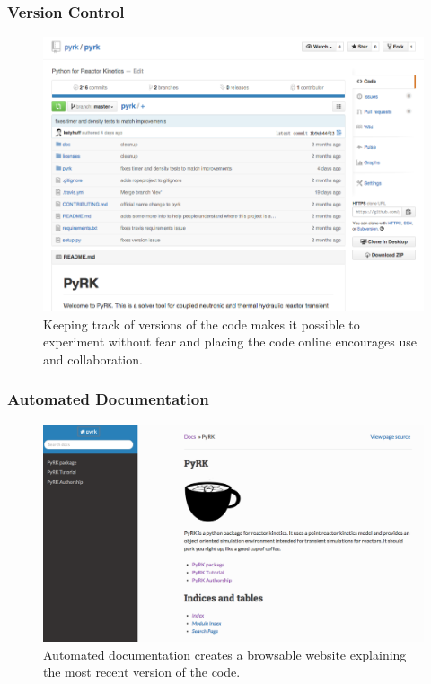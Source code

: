 \begin{frame}[fragile]
  \frametitle{Version Control}
  \begin{figure}[htbp!]
    \begin{center}
      \includegraphics[height=0.7\textheight]{./progress/github_pyrk.png}
    \end{center}
    \caption{Keeping track of versions of the code makes it possible to
    experiment without fear and placing the code online encourages use and
    collaboration.}
    \label{fig:doc_pyrk}
  \end{figure}
\end{frame}

\begin{frame}[fragile]
  \frametitle{Automated Documentation}
  \begin{figure}[htbp!]
    \begin{center}
      \includegraphics[height=0.7\textheight]{./progress/doc_pyrk.png}
    \end{center}
    \caption{Automated documentation creates a browsable website explaining the most recent version of the code.}
    \label{fig:doc_pyrk}
  \end{figure}
\end{frame}

